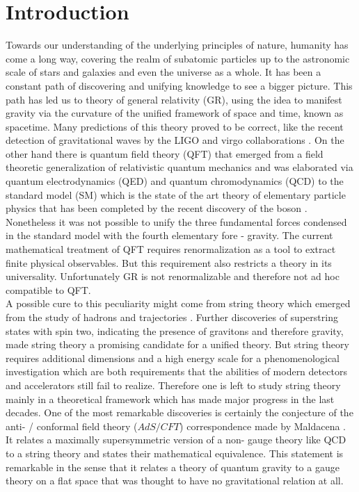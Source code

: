 \chapter{Introduction}
Towards our understanding of the underlying principles of nature, humanity has come a long way, covering the realm of subatomic particles up to the astronomic scale of stars and galaxies and even the universe as a whole. It has been a constant path of discovering and unifying knowledge to see a bigger picture. This path has led us to  theory of general relativity (GR), using the idea to manifest gravity via the curvature of the unified framework of space and time, known as spacetime. Many predictions of this theory proved to be correct, like the recent detection of gravitational waves by the LIGO and virgo collaborations \cite{Abbott:2016blz,Abbott:2016nmj}. On the other hand there is quantum field theory (QFT) that emerged from a field theoretic generalization of relativistic quantum mechanics and was elaborated via quantum electrodynamics (QED) and quantum chromodynamics (QCD) to the standard model (SM) which is the state of the art theory of elementary particle physics that has been completed by the recent discovery of the  boson \cite{Chatrchyan:2012xdj,Aad:2012tfa}. Nonetheless it was not possible to unify the three fundamental forces condensed in the standard model with the fourth elementary fore - gravity. The current mathematical treatment of QFT requires renormalization as a tool to extract finite physical observables. But this requirement also restricts a theory in its universality. Unfortunately GR is not renormalizable and therefore not ad hoc compatible to QFT.\\
A possible cure to this peculiarity might come from string theory which emerged from the study of hadrons and  trajectories \cite{Veneziano:1968yb}. Further discoveries of superstring states with spin two, indicating the presence of gravitons and therefore gravity, made string theory a promising candidate for a unified theory. But string theory requires additional dimensions and a high energy scale for a phenomenological investigation which are both requirements that the abilities of modern detectors and accelerators still fail to realize. Therefore one is left to study string theory mainly in a theoretical framework which has made major progress in the last decades. One of the most remarkable discoveries is certainly the conjecture of the anti- / conformal field theory ($AdS/CFT$) correspondence made by Maldacena \cite{maldacena1}. It relates a maximally supersymmetric version of a non- gauge theory like QCD to a string theory and states their mathematical equivalence. This statement is remarkable in the sense that it relates a theory of quantum gravity to a gauge theory on a flat space that was thought to have no gravitational relation at all.\\
